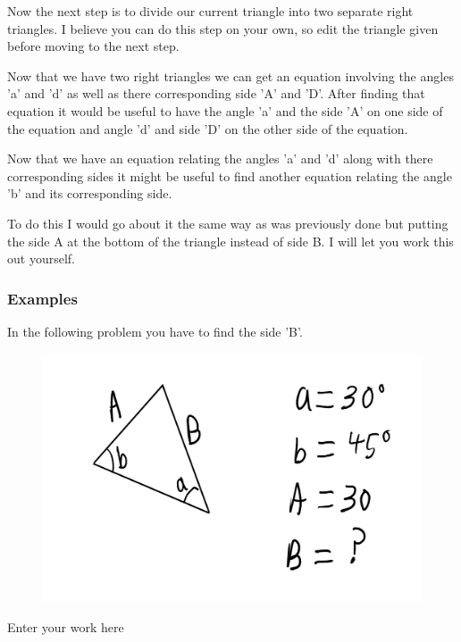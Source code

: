\documentclass[12pt]{article}
\begin{document}
Now the next step is to divide our current triangle into two separate right triangles. I believe you can do this step on your own, so edit the triangle given before moving to the next step.

Now that we have two right triangles we can get an equation involving the angles 'a' and 'd' as well as there corresponding side 'A' and 'D'. After finding that equation it would be useful to have the angle 'a' and the side 'A' on one side of the equation and angle 'd' and side 'D' on the other side of the equation.

\parbox[][5cm][t]{8cm}{}

Now that we have an equation relating the angles 'a' and 'd' along with there corresponding sides it might be useful to find another equation relating the angle 'b' and its corresponding side.

To do this I would go about it the same way as was previously done but putting the side A at the bottom of the triangle instead of side B. I will let you work this out yourself.

\parbox[][12cm][t]{8cm}{}


\subsubsection{Examples}
In the following problem you have to find the side 'B'.
\begin{figure}[h]
\includegraphics[scale=0.25]{lawOfSinProb1.png}
\end{figure}

\parbox[][13cm][t]{8cm}{Enter your work here}
\end{document}
